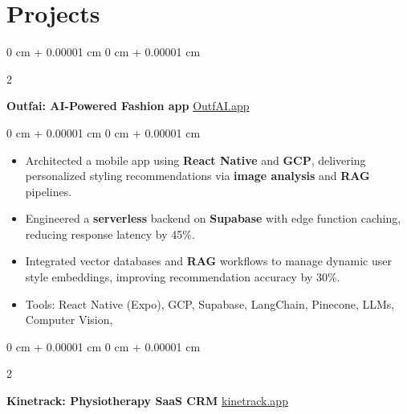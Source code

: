\documentclass[10pt, letterpaper]{article}
\newenvironment{highlights}{
    \begin{itemize}[
        topsep=0.10 cm,
        parsep=0.10 cm,
        partopsep=0pt,
        itemsep=0pt,
        leftmargin=0 cm + 10pt
    ]
}{
    \end{itemize}
} %
\newenvironment{onecolentry}{
    \begin{adjustwidth}{
        0 cm + 0.00001 cm
    }{
        0 cm + 0.00001 cm
    }
}{
    \end{adjustwidth}
} %
\newenvironment{twocolentry}[2][]{
    \onecolentry
    \def\secondColumn{#2}
    \setcolumnwidth{\fill, 4.5 cm}
    \begin{paracol}{2}
}{
    \switchcolumn \raggedleft \secondColumn
    \end{paracol}
    \endonecolentry
} %
\begin{document}
    
    \section{Projects}


        
        \begin{twocolentry}{
            \href{https://landing.outfai.app/}{OutfAI.app}
        }
            \textbf{Outfai: AI-Powered Fashion app}\end{twocolentry}

        \vspace{0.10 cm}
        \begin{onecolentry}
            \begin{highlights}
                \item Architected a mobile app using \textbf{React Native} and \textbf{GCP}, delivering personalized styling recommendations via \textbf{image analysis} and \textbf{RAG} pipelines.
                \item Engineered a \textbf{serverless} backend on \textbf{Supabase} with edge function caching, reducing response latency by 45\%.
                \item Integrated vector databases and \textbf{RAG} workflows to manage dynamic user style embeddings, improving recommendation accuracy by 30\%.
                \item Tools: React Native (Expo), GCP, Supabase, LangChain, Pinecone, LLMs, Computer Vision,

            \end{highlights}
        \end{onecolentry}


        \vspace{0.2 cm}



        \begin{twocolentry}{
            \href{https://landing.kinetrack.app/}{kinetrack.app}
        }
            \textbf{Kinetrack: Physiotherapy SaaS CRM}\end{twocolentry}
\end{document}
